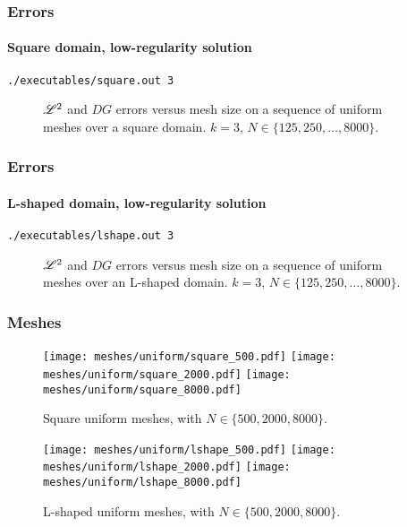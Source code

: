 \begin{frame}[fragile]
    \frametitle{Errors}
    \framesubtitle{Square domain, low-regularity solution}

    \lstinline{./executables/square.out 3}

    \begin{figure}[!ht]
        
        \caption{$\mathscr{L}^2$ and $DG$ errors versus mesh size on a sequence of uniform meshes over a square domain. $k = 3$, $N \in \{125, 250, \dots, 8000\}$.}
    \end{figure}
\end{frame}

\begin{frame}[fragile]
    \frametitle{Errors}
    \framesubtitle{L-shaped domain, low-regularity solution}

    \lstinline{./executables/lshape.out 3}

    \begin{figure}[!ht]
        
        \caption{$\mathscr{L}^2$ and $DG$ errors versus mesh size on a sequence of uniform meshes over an L-shaped domain. $k = 3$, $N \in \{125, 250, \dots, 8000\}$.}
    \end{figure}
\end{frame}

\begin{frame}
    \frametitle{Meshes}

    \begin{figure}[!ht]
        \centering
        \texttt{[image: meshes/uniform/square\_500.pdf]}
        \texttt{[image: meshes/uniform/square\_2000.pdf]}
        \texttt{[image: meshes/uniform/square\_8000.pdf]}
        \caption{Square uniform meshes, with $N \in \{500, 2000, 8000\}$.}
    \end{figure}

    \begin{figure}[!ht]
        \centering
        \texttt{[image: meshes/uniform/lshape\_500.pdf]}
        \texttt{[image: meshes/uniform/lshape\_2000.pdf]}
        \texttt{[image: meshes/uniform/lshape\_8000.pdf]}
        \caption{L-shaped uniform meshes, with $N \in \{500, 2000, 8000\}$.}
    \end{figure}
\end{frame}

